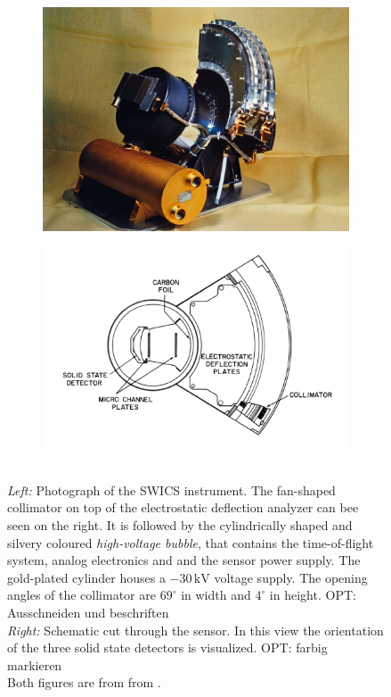 \begin{figure}
	\centering
	\begin{subfigure}{.5\textwidth}
		\centering
		\includegraphics[width=0.9\linewidth]{Figures/ULYSSES-SWICS.jpg}
	\end{subfigure}%
	\begin{subfigure}{.5\textwidth}
		\centering
		\includegraphics[width=1.1\linewidth]{Figures/swics_sensor.pdf}
	\end{subfigure}
	\caption{\\ \textit{Left:} Photograph of the SWICS instrument. The fan-shaped collimator on top of the electrostatic deflection analyzer can bee seen on the right. It is followed by the cylindrically shaped and silvery coloured \textit{high-voltage bubble}, that contains the time-of-flight system, analog electronics and and the sensor power supply. The gold-plated cylinder houses a $-30\,\mathrm{kV}$ voltage supply. The opening angles of the collimator are $69^\circ$ in width and $4^\circ$ in height. OPT: Ausschneiden und beschriften \\ \textit{Right:} Schematic cut through the sensor. In this view the orientation of the three solid state detectors is visualized. OPT: farbig markieren\\ Both figures are from from \citet{gloeckler_1992}.}
	\label{fig:swics}
\end{figure}

